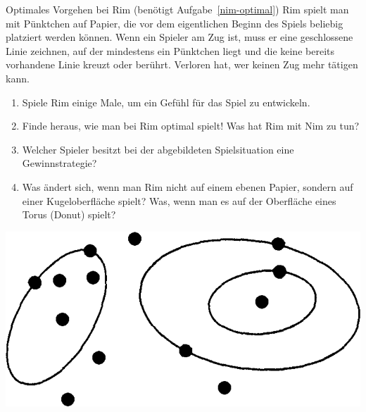 \documentclass{../zirkelblatt}
\begin{document}
\begin{aufgabe}{Optimales Vorgehen bei Rim
(benötigt Aufgabe~\ref{nim-optimal})}
Rim spielt man mit Pünktchen auf Papier, die vor dem eigentlichen Beginn des
Spiels beliebig platziert werden können. Wenn ein Spieler am Zug ist, muss er
eine geschlossene Linie zeichnen, auf der mindestens ein Pünktchen liegt und
die keine bereits vorhandene Linie kreuzt oder berührt. Verloren hat, wer
keinen Zug mehr tätigen kann.

\begin{enumerate}
\item Spiele Rim einige Male, um ein Gefühl für das Spiel zu entwickeln.
\item Finde heraus, wie man bei Rim optimal spielt! Was hat Rim mit Nim zu tun?
\item Welcher Spieler besitzt bei der abgebildeten Spielsituation eine
Gewinnstrategie?
\item Was ändert sich, wenn man Rim nicht auf einem ebenen Papier, sondern auf
einer Kugeloberfläche spielt? Was, wenn man es auf der Oberfläche eines Torus
(Donut) spielt?
\end{enumerate}

\begin{center}
\includegraphics[scale=0.3]{rim}
\end{center}
\end{aufgabe}
\end{document}
